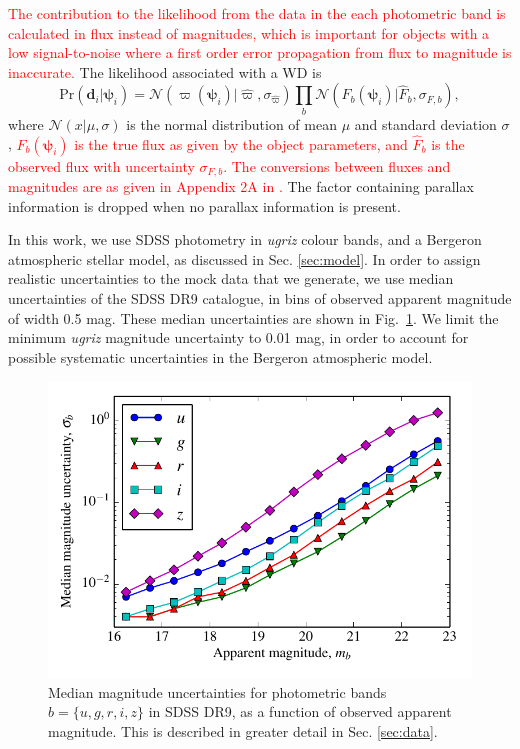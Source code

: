 \documentclass[fleqn,usenatbib]{mnras}
\newcommand{\changes}[1]{\textcolor{red}{#1}}
\newcommand{\objp}{\boldsymbol{\psi}}
\newcommand{\data}{\mathbf{d}}
\newcommand{\pr}{\text{Pr}}
\begin{document}
\changes{The contribution to the likelihood from the data in the each photometric band 
is calculated in flux instead of magnitudes, which is important for objects with a low signal-to-noise where a first order error propagation from flux to magnitude is inaccurate.} The likelihood associated with a WD is
\begin{equation}\label{eq:likelihood}
	\pr(\data_i | \objp_i) = \mathcal{N}(\varpi(\objp_i)|\hat{\varpi},\sigma_{\hat{\varpi}})\prod_{b} \mathcal{N}(F_b(\objp_i)|\hat{F}_b,\sigma_{F,b}),
\end{equation}
where $\mathcal{N}(x | \mu,\sigma)$ is the normal distribution of mean $\mu$ and standard deviation $\sigma$, \changes{$F_b(\objp_i)$ is the true flux as given by the object parameters, and $\hat{F}_b$ is the observed flux with uncertainty $\sigma_{F,b}$. The conversions between fluxes and magnitudes are as given in Appendix 2A in \cite{2012MNRAS.419..390M}.} The factor containing parallax information is dropped when no parallax information is present.

In this work, we use SDSS photometry in \emph{ugriz} colour bands, and a Bergeron atmospheric stellar model, as discussed in Sec. \ref{sec:model}. In order to assign realistic uncertainties to the mock data that we generate, we use median uncertainties of the SDSS DR9 catalogue, in bins of observed apparent magnitude of width 0.5 mag. These median uncertainties are shown in Fig.~\ref{fig:magnitude_error}. We limit the minimum \emph{ugriz} magnitude uncertainty to 0.01 mag, in order to account for possible systematic uncertainties in the Bergeron atmospheric model.

\begin{figure}
	\includegraphics[width=\columnwidth]{median_app_errors.pdf}
    \caption{Median magnitude uncertainties for photometric bands $b=\{u,g,r,i,z\}$ in SDSS DR9, as a function of observed apparent magnitude. This is described in greater detail in Sec. \ref{sec:data}.}
    \label{fig:magnitude_error}
\end{figure}
\end{document}
